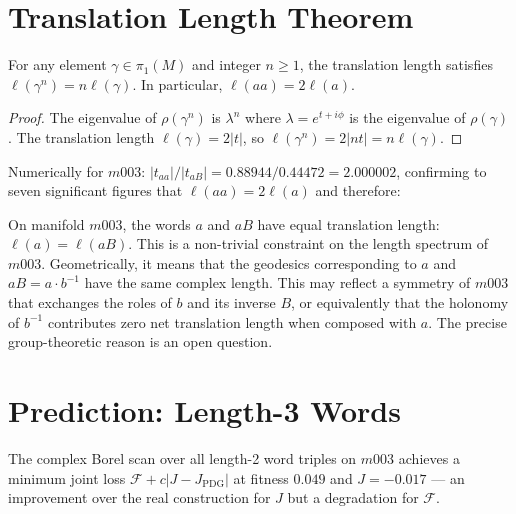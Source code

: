 \documentclass[epjc3]{svjour3}
\begin{document}
\section{Translation Length Theorem}
\label{sec:length}

\begin{proposition}
\label{prop:length_theorem}
For any element $\gamma \in \pi_1(M)$ and integer $n \geq 1$,
the translation length satisfies $\ell(\gamma^n) = n\ell(\gamma)$.
In particular, $\ell(aa) = 2\ell(a)$.
\end{proposition}

\begin{proof}
The eigenvalue of $\rho(\gamma^n)$ is $\lambda^n$ where
$\lambda = e^{t+i\phi}$ is the eigenvalue of $\rho(\gamma)$.
The translation length $\ell(\gamma) = 2|t|$, so
$\ell(\gamma^n) = 2|nt| = n\ell(\gamma)$.
\end{proof}

Numerically for $m003$: $|t_{aa}|/|t_{aB}| = 0.88944/0.44472
= 2.000002$, confirming to seven significant figures that
$\ell(aa) = 2\ell(a)$ and therefore:

\begin{corollary}
\label{cor:isospectral}
On manifold $m003$, the words $a$ and $aB$ have equal
translation length: $\ell(a) = \ell(aB)$.
This is a non-trivial constraint on the length spectrum of $m003$.
Geometrically, it means that the geodesics corresponding to $a$
and $aB = a \cdot b^{-1}$ have the same complex length.
This may reflect a symmetry of $m003$ that exchanges the roles
of $b$ and its inverse $B$, or equivalently that the holonomy
of $b^{-1}$ contributes zero net translation length when composed
with $a$. The precise group-theoretic reason is an open question.
\end{corollary}

\section{Prediction: Length-3 Words}
\label{sec:prediction_scan}

The complex Borel scan over all length-2 word triples on $m003$
achieves a minimum joint loss $\mathcal{F} + c|J - J_{\mathrm{PDG}}|$
at fitness $0.049$ and $J = -0.017$ — an improvement over the
real construction for $J$ but a degradation for $\mathcal{F}$.
\end{document}
